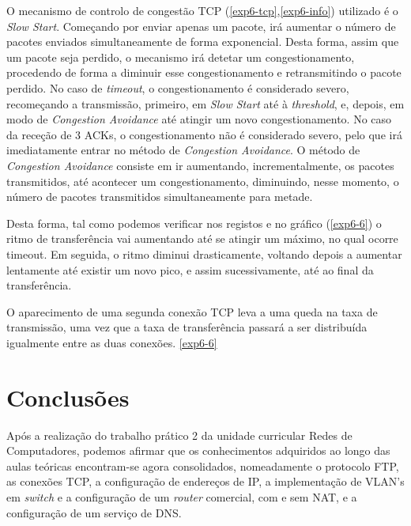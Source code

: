 \documentclass[article, a4paper, 11pt, oneside]{memoir}
\begin{document}
O mecanismo de controlo de congestão TCP (\ref{exp6-tcp},\ref{exp6-info}) utilizado é o
\textit{Slow Start}. Começando por enviar apenas um pacote, irá aumentar o número de pacotes
enviados simultaneamente de forma exponencial. Desta forma, assim que um pacote seja perdido,
o mecanismo irá detetar um congestionamento, procedendo de forma a diminuir esse congestionamento e
retransmitindo o pacote perdido. No caso de \textit{timeout}, o congestionamento é considerado severo,
recomeçando a transmissão, primeiro, em \textit{Slow Start} até à \textit{threshold}, e, depois,
em modo de \textit{Congestion Avoidance} até atingir um novo congestionamento.
No caso da receção de 3 ACKs, o congestionamento não é considerado severo, pelo que irá
imediatamente entrar no método de \textit{Congestion Avoidance}.
O método de \textit{Congestion Avoidance} consiste em ir aumentando, incrementalmente,
os pacotes transmitidos, até acontecer um congestionamento, diminuindo, nesse momento, o
número de pacotes transmitidos simultaneamente para metade.

Desta forma, tal como podemos verificar nos registos e no gráfico (\ref{exp6-6}) o ritmo de transferência
vai aumentando até se atingir um máximo, no qual ocorre timeout. Em seguida, o ritmo diminui
drasticamente, voltando depois a aumentar lentamente até existir um novo pico, e assim
sucessivamente, até ao final da transferência.

O aparecimento de uma segunda conexão TCP leva a uma queda na taxa de transmissão, uma vez
que a taxa de transferência passará a ser distribuída igualmente entre as duas conexões. \ref{exp6-6}

\chapter[Conclusões][Conclusões]{Conclusões} \label{\thechapter}

Após a realização do trabalho prático 2 da unidade curricular Redes de Computadores,
podemos afirmar que os conhecimentos adquiridos ao longo das aulas teóricas encontram-se
agora consolidados, nomeadamente o protocolo FTP, as conexões TCP, a configuração de
endereços de IP, a implementação de VLAN's em \textit{switch} e a configuração de um
\textit{router} comercial, com e sem NAT, e a configuração de um serviço de DNS.
\end{document}
